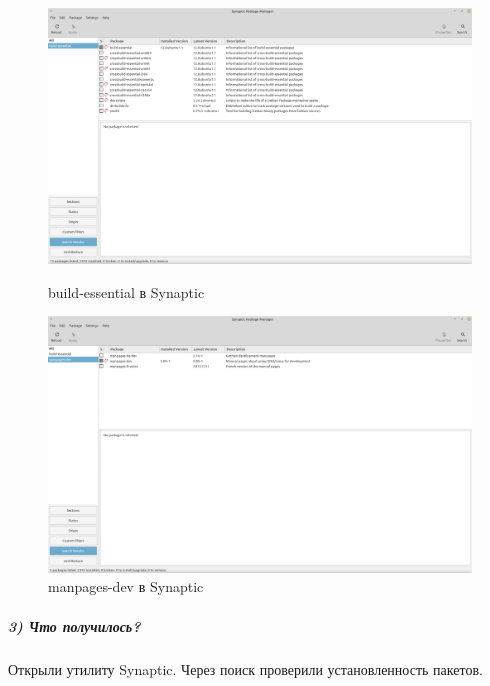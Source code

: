 \begin{figure}[!htp]
    \begin{minipage}{0.49\textwidth}
        \centering
        \includegraphics[width=\linewidth]
            {input/task-2/2/build-essential.png}
        \caption{build-essential в Synaptic}
        \label{fig:build-essential}
    \end{minipage}
    \begin{minipage}{0.49\textwidth}
        \centering
        \includegraphics[width=\linewidth]
            {input/task-2/2/manpages-dev.png}
        \caption{manpages-dev в Synaptic}
        \label{fig:manpages-dev}
    \end{minipage}
\end{figure}

\subparagraph{3) Что получилось?}

Открыли утилиту Synaptic. Через поиск проверили установленность пакетов.
